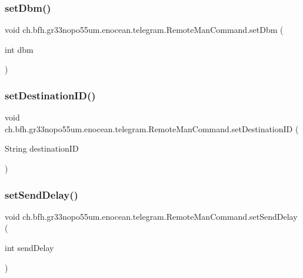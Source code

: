 \subsubsection{\texorpdfstring{set\+Dbm()}{setDbm()}}
{\footnotesize\ttfamily void ch.\+bfh.\+gr33nopo55um.\+enocean.\+telegram.\+Remote\+Man\+Command.\+set\+Dbm (\begin{DoxyParamCaption}\item[{int}]{dbm }\end{DoxyParamCaption})}

\hypertarget{classch_1_1bfh_1_1gr33nopo55um_1_1enocean_1_1telegram_1_1_remote_man_command_ae98150ec6ac51e8922baaca923a6353e}{}\label{classch_1_1bfh_1_1gr33nopo55um_1_1enocean_1_1telegram_1_1_remote_man_command_ae98150ec6ac51e8922baaca923a6353e} 
\subsubsection{\texorpdfstring{set\+Destination\+I\+D()}{setDestinationID()}}
{\footnotesize\ttfamily void ch.\+bfh.\+gr33nopo55um.\+enocean.\+telegram.\+Remote\+Man\+Command.\+set\+Destination\+ID (\begin{DoxyParamCaption}\item[{String}]{destination\+ID }\end{DoxyParamCaption})}

\hypertarget{classch_1_1bfh_1_1gr33nopo55um_1_1enocean_1_1telegram_1_1_remote_man_command_a9c8d0617c4eb4c4c9c2433d7cec43b64}{}\label{classch_1_1bfh_1_1gr33nopo55um_1_1enocean_1_1telegram_1_1_remote_man_command_a9c8d0617c4eb4c4c9c2433d7cec43b64} 
\subsubsection{\texorpdfstring{set\+Send\+Delay()}{setSendDelay()}}
{\footnotesize\ttfamily void ch.\+bfh.\+gr33nopo55um.\+enocean.\+telegram.\+Remote\+Man\+Command.\+set\+Send\+Delay (\begin{DoxyParamCaption}\item[{int}]{send\+Delay }\end{DoxyParamCaption})}


